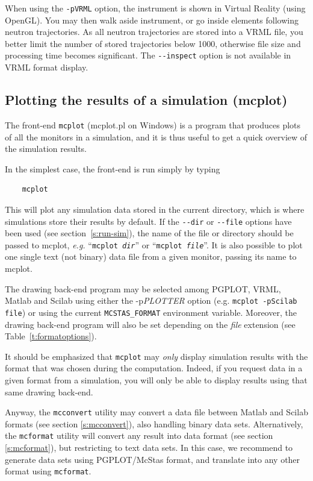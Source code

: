 When using the \verb+-pVRML+ option, the instrument is shown in Virtual Reality (using OpenGL). You may then walk aside instrument, or go inside elements following neutron trajectories. As all neutron trajectories are stored into a VRML file, you better limit the number of stored trajectories below 1000, otherwise file size and processing time becomes significant. The \verb+--inspect+ option is not available in VRML format display.

\subsection{Plotting the results of a simulation (mcplot)}
\label{s:mcplot}

The front-end \verb+mcplot+ (mcplot.pl on Windows) is a program that produces
plots of all the monitors in a simulation, and it is thus useful to get
a quick overview of the simulation results.

In the simplest case, the front-end is run simply by typing
\begin{lstlisting}
    mcplot
\end{lstlisting}
This will plot any simulation data stored in the current directory,
which is where simulations store their results by default. If the
\verb+--dir+ or \verb+--file+ options have been used (see
section~\ref{s:run-sim}), the name of the file or directory should be
passed to mcplot, {\em e.g.} ``\texttt{mcplot {\it dir}}'' or ``\texttt{mcplot
  {\it file}}''.
It is also possible to plot one single text (not binary) data file from a given monitor, passing its name to mcplot.

The drawing back-end program may be selected among PGPLOT, VRML, Matlab and Scilab using either the -p{\it PLOTTER} option (e.g. \verb+mcplot -pScilab file+) or using the current \verb+MCSTAS_FORMAT+ environment variable.  Moreover, the drawing back-end program will also be set depending on the {\it file} extension (see Table~\ref{t:formatoptions}).

It should be emphasized that \verb+mcplot+ may \emph{only} display simulation results with the format that was chosen during the computation. Indeed, if you request data in a given format from a simulation, you will only be able to display results using that same drawing back-end.

Anyway, the \verb+mcconvert+ utility may convert a \MCS data file between Matlab and Scilab formats (see section \ref{s:mcconvert}), also handling binary data sets. Alternatively, the \verb+mcformat+ utility will convert any \MCS result into data format (see section \ref{s:mcformat}), but restricting to text data sets. In this case, we recommend to generate data sets using PGPLOT/McStas format, and translate into any other format using \verb+mcformat+.

